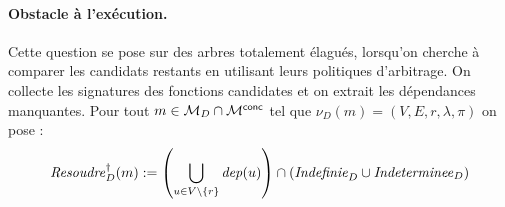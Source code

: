 \documentclass[review]{jflart}
\begin{document}
\paragraph{Obstacle à l'exécution.}
Cette question se pose sur des arbres totalement élagués, lorsqu'on cherche à comparer les candidats restants en utilisant leurs politiques d'arbitrage. On collecte les signatures des fonctions candidates et on extrait les dépendances manquantes. Pour tout $m\in\mathcal{M}_D\cap\mathcal{M}^{\mathsf{conc}}$ tel que $\nu_D(m)=(V,E,r,\lambda,\pi)$ on pose :
\[
\mathit{Resoudre}^\dagger_D(m) := \left(\bigcup_{u\in V\setminus\{r\}} \mathit{dep}(u)\right) \cap (\mathit{Indefinie}_D\cup\mathit{Indeterminee}_D)
\]


%
\end{document}
